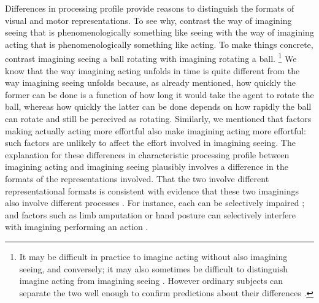 \documentclass[12pt,\papersize]{extarticle}
\begin{document}
Differences in processing profile provide reasons to distinguish the formats of visual and motor representations. To see why, contrast the way of imagining seeing that is phenomenologically something like seeing with the way of imagining acting that is phenomenologically something like acting. To make things concrete, contrast imagining seeing a ball rotating with imagining rotating a ball.%
\footnote{It may be difficult in practice to imagine acting without also imagining seeing, and conversely; it may also sometimes be difficult to distinguish imagine acting from imagining seeing \citep[as][p.\ 170 note]{currie:1997_mental}. However ordinary subjects can separate the two well enough to confirm predictions about their differences \citep[see, e.g.,][]{kosslyn:2001_imagining}.
}
We know that the way imagining acting unfolds in time is quite different from the way imagining seeing unfolds because, as already mentioned, how quickly the former can be done is a function of how long it would take the agent to rotate the ball, whereas how quickly the latter can be done depends on how rapidly the ball can rotate and still be perceived as rotating. Similarly, we mentioned that factors making actually acting more effortful also make imagining acting more effortful: such factors are unlikely to affect the effort involved in imagining seeing. The explanation for these differences in characteristic processing profile between imagining acting and imagining seeing plausibly involves a difference in the formats of the representations involved. That the two involve different representational formats is consistent with  evidence that these two imaginings also involve different processes \citep{kosslyn:2001_imagining}. For instance, each can be selectively impaired \citep{sirigu:2011_motor}; and factors such as limb amputation or hand posture can selectively interfere with imagining performing an action \citep{nico:2004_left, vargas:2004s_influence,  fourkas:2006_influence}. 
\end{document}
